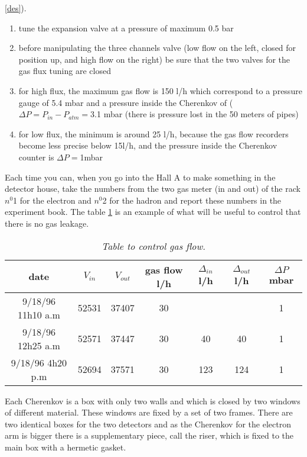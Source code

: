 \documentclass[12pt]{article}
\begin{document}
\ref{des}).
\begin{enumerate}
\item tune the expansion valve at a pressure of maximum 0.5 bar
\item before manipulating the three channels valve (low flow on the left, 
closed for position up, and high flow on the right) be sure that the two valves
for the gas flux tuning are closed
\item for high flux, the maximum gas flow is 150 l/h which correspond 
to a pressure gauge of 5.4 mbar and a pressure inside the Cherenkov of 
($\Delta P=P_{in}-P_{atm}=$3.1 mbar
 (there is pressure lost in the 50 meters of pipes)
\item for low flux, the minimum is around 25 l/h,
 because the gas flow recorders become less precise below 15l/h,
 and the pressure inside the Cherenkov counter 
is $\Delta P=$1mbar
\end{enumerate}
Each time you can, when you go into the Hall A to make something in the
detector house, take the numbers from the two gas meter (in and out) of the
rack $n^0$1 for the electron and $n^0$2 for the hadron and report these
numbers in the experiment book. The table \ref{gamet} is an example of what
will be useful to control that there is no gas leakage.
\begin{table}
\begin{center}
\begin{tabular}{|c|c|c|c|c|c|c|}
\hline
date & $V_{in}$ & $V_{out}$ & gas flow l/h& $\Delta_{in}$ l/h &
 $\Delta_{out}$ l/h & $\Delta P$mbar \\
\hline
9/18/96 11h10 a.m & 52531 & 37407 & 30 & & & 1 \\ 
9/18/96 12h25 a.m & 52571 & 37447 & 30 & 40 & 40 & 1 \\
9/18/96 4h20 p.m & 52694 & 37571 & 30 & 123 & 124 & 1 \\
\hline
\end{tabular}
\label{gamet}
\caption{ {\em Table to control gas flow.}}
\end{center}
\end{table}

\newpage
{}
\label{cons}
Each Cherenkov is a box with only two walls and which is closed by two windows 
of different material. These windows are fixed by a set of two frames. There
are two identical boxes for the two detectors and as the Cherenkov for the 
electron arm is bigger there is a supplementary piece, call the riser, which
is fixed to the main box with a hermetic gasket.  
\end{document}
